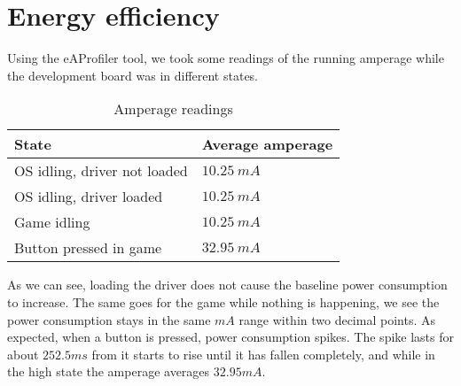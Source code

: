 \section{Energy efficiency}
Using the eAProfiler tool, we took some readings of the running amperage while the development board was in different states.

\begin{table}[h!]
    \centering
    \begin{tabular}{|l|l|}
        \hline
        State                           & Average amperage \\ \hline
        OS idling, driver not loaded    & $10.25 ~mA$ \\ \hline
        OS idling, driver loaded        & $10.25 ~mA$ \\ \hline
        Game idling                     & $10.25 ~mA$ \\ \hline
        Button pressed in game          & $32.95 ~mA$ \\ \hline
    \end{tabular}
    \caption{Amperage readings}
\end{table}

As we can see, loading the driver does not cause the baseline power consumption to increase.
The same goes for the game while nothing is happening, we see the power consumption stays in the same $mA$ range within two decimal points.
As expected, when a button is pressed, power consumption spikes.
The spike lasts for about $252.5ms$ from it starts to rise until it has fallen completely,
and while in the high state the amperage averages $32.95mA$.
